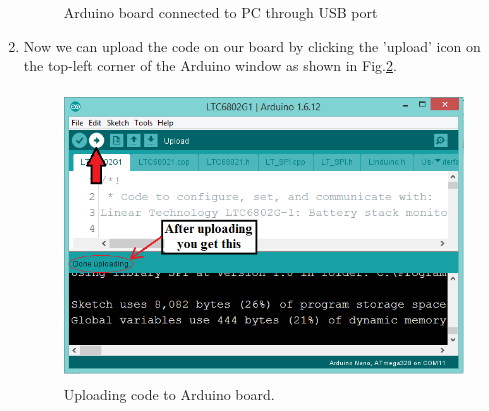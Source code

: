\begin{enumerate}
\begin{figure}[h]
    \caption{Arduino board connected to PC through USB port}
    \label{fig:ArdConnection}
    \end{figure}
\item Now we can upload the code on our board by clicking the 'upload' icon on 
the top-left corner of the Arduino window as shown in Fig.\ref{fig:Ardcodeupload}. 
    \begin{figure}[h]
        \centering
        \includegraphics[width=11.11cm,height=7.69cm]{figures/image10}
        \caption{Uploading code to Arduino board.}
        \label{fig:Ardcodeupload}
    \end{figure}
\end{enumerate}

